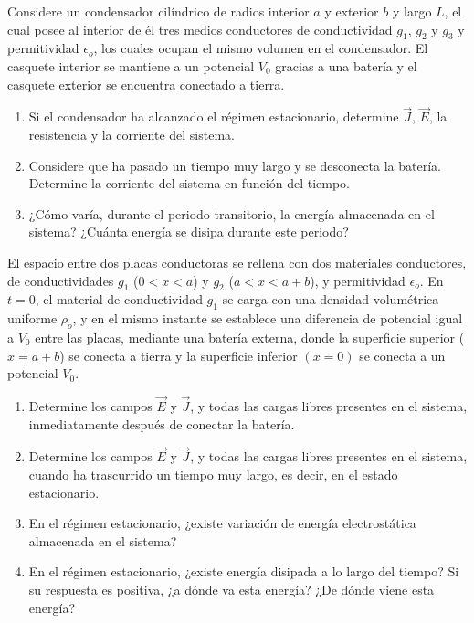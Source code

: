 \bigbreak
\np

Considere un condensador cilíndrico de radios interior $a$ y exterior $b$ y largo $L$, el cual posee al interior de él tres medios conductores de conductividad $g_1$, $g_2$ y $g_3$ y permitividad $\epsilon_o$, los cuales ocupan el mismo volumen en el condensador. El casquete interior se mantiene a un potencial $V_0$ gracias a una batería y el casquete exterior se encuentra conectado a tierra.

\begin{enumerate}[label=\alph*)]
    \item Si el condensador ha alcanzado el régimen estacionario, determine $\Vec{J}$, $\Vec{E}$, la resistencia y la corriente del sistema.
    \item Considere que ha pasado un tiempo muy largo y se desconecta la batería. Determine la corriente del sistema en función del tiempo.
    \item  ¿Cómo varía, durante el periodo transitorio, la energía almacenada en el sistema? ¿Cuánta energía se disipa durante este periodo?
\end{enumerate}


\np

El espacio entre dos placas conductoras se rellena con dos materiales conductores, de conductividades $g_1$ ($0 < x < a$) y $g_2$ ($a < x < a + b$), y permitividad $\epsilon_o$. En $t = 0$, el material de conductividad $g_1$ se carga con una densidad volumétrica uniforme $\rho_o$, y en el mismo instante se establece una diferencia de potencial igual a $V_0$ entre las placas, mediante una batería externa, donde la superficie superior ($x = a + b$) se conecta a tierra y la superficie inferior $(x = 0)$ se conecta a un potencial $V_0$.

\begin{enumerate}[label=\alph*)]
    \item Determine los campos $\Vec{E}$ y $\Vec{J}$, y todas las cargas libres presentes en el sistema, inmediatamente después de conectar la batería.
    \item Determine los campos $\Vec{E}$ y $\Vec{J}$, y todas las cargas libres presentes en el sistema, cuando ha trascurrido un tiempo muy largo, es decir, en el estado estacionario.
    \item En el régimen estacionario, ¿existe variación de energía electrostática almacenada en el sistema?
    \item En el régimen estacionario, ¿existe energía disipada a lo largo del tiempo? Si su respuesta es positiva, ¿a dónde va esta energía? ¿De dónde viene esta energía?
\end{enumerate}


\newpage